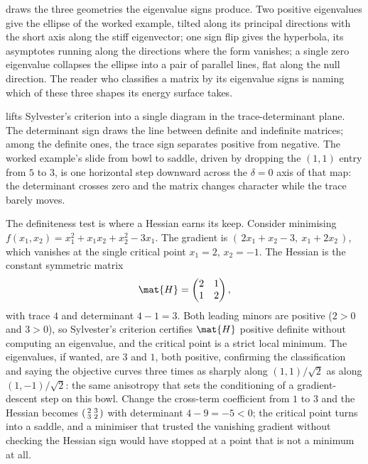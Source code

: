 

 draws the three geometries the
eigenvalue signs produce. Two positive eigenvalues give the ellipse of
the worked example, tilted along its principal directions with the
short axis along the stiff eigenvector; one sign flip gives the
hyperbola, its asymptotes running along the directions where the form
vanishes; a single zero eigenvalue collapses the ellipse into a pair
of parallel lines, flat along the null direction. The reader who
classifies a matrix by its eigenvalue signs is naming which of these
three shapes its energy surface takes.



 lifts Sylvester's criterion
into a single diagram in the trace-determinant plane. The determinant
sign draws the line between definite and indefinite matrices; among the
definite ones, the trace sign separates positive from negative. The
worked example's slide from bowl to saddle, driven by dropping the
$(1,1)$ entry from $5$ to $3$, is one horizontal step downward across
the $\delta = 0$ axis of that map: the determinant crosses zero and the
matrix changes character while the trace barely moves.

\begin{example}
The definiteness test is where a Hessian earns its keep. Consider
minimising $f(x_1, x_2) = x_1^{2} + x_1 x_2 + x_2^{2} - 3x_1$. The
gradient is $(\,2x_1 + x_2 - 3,\ x_1 + 2x_2\,)$, which vanishes at the
single critical point $x_1 = 2$, $x_2 = -1$. The Hessian is the
constant symmetric matrix
\[
\mat{H} = \begin{pmatrix} 2 & 1 \\ 1 & 2 \end{pmatrix},
\]
with trace $4$ and determinant $4 - 1 = 3$. Both leading minors are
positive ($2 > 0$ and $3 > 0$), so Sylvester's criterion certifies
$\mat{H}$ positive definite without computing an eigenvalue, and the
critical point is a strict local minimum. The eigenvalues, if wanted,
are $3$ and $1$, both positive, confirming the classification and
saying the objective curves three times as sharply along $(1,1)/
\sqrt{2}$ as along $(1,-1)/\sqrt{2}$: the same anisotropy that sets the
conditioning of a gradient-descent step on this bowl. Change the
cross-term coefficient from $1$ to $3$ and the Hessian becomes
$\begin{psmallmatrix} 2 & 3 \\ 3 & 2 \end{psmallmatrix}$ with
determinant $4 - 9 = -5 < 0$; the critical point turns into a saddle,
and a minimiser that trusted the vanishing gradient without checking
the Hessian sign would have stopped at a point that is not a minimum
at all.
\end{example}

